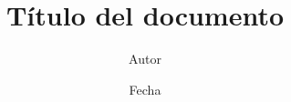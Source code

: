 \documentclass[a4paper,11pt]{article}
\begin{document}
\title{Título del documento}
\author{Autor}
\date{Fecha}
\maketitle
\end{document}
